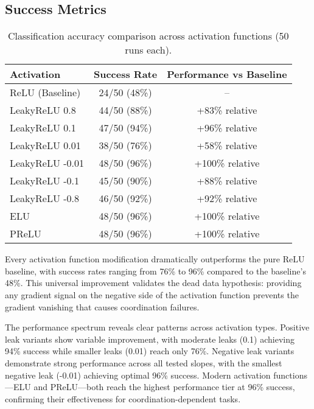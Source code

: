 
\subsection*{Success Metrics}

\begin{table}[ht]
\centering
\caption{Classification accuracy comparison across activation functions (50 runs each).}
\label{tab:relu1-activation-success}
\begin{tabular}{lcc}
\toprule
Activation & Success Rate & Performance vs Baseline \\
\midrule
ReLU (Baseline) & 24/50 (48\%) & -- \\
LeakyReLU 0.8 & 44/50 (88\%) & +83\% relative \\
LeakyReLU 0.1 & 47/50 (94\%) & +96\% relative \\
LeakyReLU 0.01 & 38/50 (76\%) & +58\% relative \\
LeakyReLU -0.01 & 48/50 (96\%) & +100\% relative \\
LeakyReLU -0.1 & 45/50 (90\%) & +88\% relative \\
LeakyReLU -0.8 & 46/50 (92\%) & +92\% relative \\
ELU & 48/50 (96\%) & +100\% relative \\
PReLU & 48/50 (96\%) & +100\% relative \\
\bottomrule
\end{tabular}
\end{table}

Every activation function modification dramatically outperforms the pure ReLU baseline, with success rates ranging from 76\% to 96\% compared to the baseline's 48\%. This universal improvement validates the dead data hypothesis: providing any gradient signal on the negative side of the activation function prevents the gradient vanishing that causes coordination failures.

The performance spectrum reveals clear patterns across activation types. Positive leak variants show variable improvement, with moderate leaks (0.1) achieving 94\% success while smaller leaks (0.01) reach only 76\%. Negative leak variants demonstrate strong performance across all tested slopes, with the smallest negative leak (-0.01) achieving optimal 96\% success. Modern activation functions—ELU and PReLU—both reach the highest performance tier at 96\% success, confirming their effectiveness for coordination-dependent tasks.

